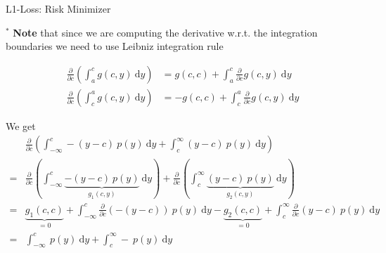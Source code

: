 \documentclass[11pt,compress,t,notes=noshow, xcolor=table]{beamer}
\begin{document}
\begin{framev}[fs=footnotesize]{L1-Loss: Risk Minimizer}

$^\ast$ \textbf{Note} that since we are computing the derivative w.r.t. the integration boundaries we need to use Leibniz integration rule 

\begin{align*}
\frac{\partial}{\partial c} (\int_a^c g(c, y) ~\text{d}y) &= g(c, c) + \int_a^c \frac{\partial}{\partial c} g(c, y) ~\text{d}y \\
\frac{\partial}{\partial c} (\int_c^a g(c, y) ~\text{d}y) &= - g(c, c) + \int_c^a \frac{\partial}{\partial c} g(c, y) ~\text{d}y    
\end{align*}

We get 
\begin{align*}
&\frac{\partial}{\partial c} (\int_{-\infty}^c -(y - c)~p(y)~\text{d}y + \int_c^\infty (y - c)~p(y)~\text{d}y ) \\
=& \frac{\partial}{\partial c} (\int_{-\infty}^c \underbrace{-(y - c)~p(y)}_{g_1(c, y)}~\text{d}y) + \frac{\partial}{\partial c} (\int_c^\infty \underbrace{(y - c)~p(y)}_{g_2(c, y)}~\text{d}y ) \\
=& \underbrace{g_1(c, c)}_{=0} + \int_{-\infty}^c \frac{\partial}{\partial c}  (-(y - c))~p(y)~\text{d}y - \underbrace{g_2(c, c)}_{= 0} + \int_c^\infty \frac{\partial}{\partial c}  (y - c)~p(y)~\text{d}y \\
=& \int_{-\infty}^c  ~p(y)~\text{d}y + \int_c^\infty -~p(y)~\text{d}y
\end{align*}

\end{framev}
\end{document}
